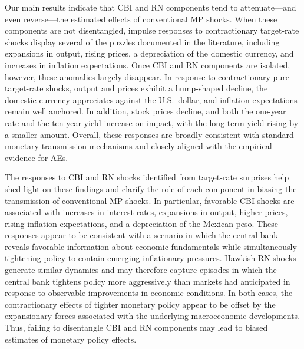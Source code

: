 \documentclass[12pt, reqno]{article}
\begin{document}
Our main results indicate that CBI and RN components tend to attenuate—and even reverse—the estimated effects of conventional MP shocks. When these components are not disentangled, impulse responses to contractionary target-rate shocks display several of the puzzles documented in the literature, including expansions in output, rising prices, a depreciation of the domestic currency, and increases in inflation expectations. Once CBI and RN components are isolated, however, these anomalies largely disappear. In response to contractionary pure target-rate shocks, output and prices exhibit a hump-shaped decline, the domestic currency appreciates against the U.S.\ dollar, and inflation expectations remain well anchored. In addition, stock prices decline, and both the
one-year rate and the ten-year yield increase on impact, with the long-term yield rising by
a smaller amount. Overall, these responses are broadly consistent with standard monetary
transmission mechanisms and closely aligned with the empirical evidence for AEs.

The responses to CBI and RN shocks identified from target-rate surprises help shed light on these findings and clarify the role of each component in biasing the transmission of conventional MP shocks. In particular, favorable CBI shocks are associated with increases in interest rates, expansions in output, higher prices, rising inflation expectations, and a depreciation of the Mexican peso. These responses appear to be consistent with a scenario in which the central bank reveals favorable information about economic fundamentals while simultaneously tightening policy to contain emerging inflationary pressures. Hawkish RN shocks generate similar dynamics and may therefore capture episodes in which the central bank tightens policy more aggressively than markets had anticipated in response to observable improvements in economic conditions. In both cases, the contractionary effects of tighter monetary policy appear to be offset by the expansionary forces associated with the underlying macroeconomic developments. Thus, failing to disentangle CBI and RN components may lead to biased estimates of monetary policy effects.
\end{document}

